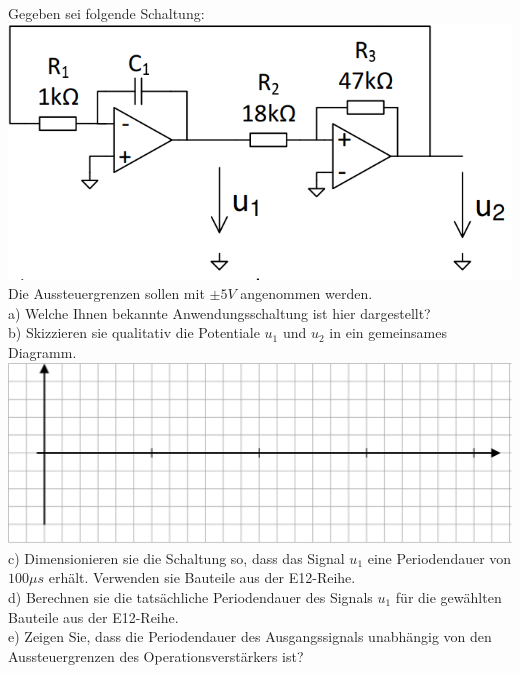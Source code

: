 \documentclass[A4]{scrartcl}
\begin{document}
  Gegeben sei folgende Schaltung:\\
  \includegraphics{Schaltung14.png}\\
  Die Aussteuergrenzen sollen mit $\pm 5V$ angenommen werden.\\
  a) Welche Ihnen bekannte Anwendungsschaltung ist hier dargestellt?\\
  b) Skizzieren sie qualitativ die Potentiale $u_1$ und $u_2$ in ein gemeinsames Diagramm.\\
  \includegraphics{pot_dia.png}\\
  c) Dimensionieren sie die Schaltung so, dass das Signal $u_1$ eine Periodendauer von $100 \mu s$ erhält. Verwenden sie Bauteile aus der E12-Reihe.\\
  d) Berechnen sie die tatsächliche Periodendauer des Signals $u_1$ für die gewählten Bauteile aus der E12-Reihe.\\
  e) Zeigen Sie, dass die Periodendauer des Ausgangssignals unabhängig von den Aussteuergrenzen des Operationsverstärkers ist?\\
\end{document}
